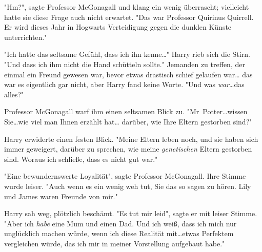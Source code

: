 "Hm?", sagte Professor McGonagall und klang ein wenig überrascht; vielleicht hatte sie diese Frage auch nicht erwartet. "Das war Professor Quirinus Quirrell. Er wird dieses Jahr in Hogwarts Verteidigung gegen die dunklen Künste unterrichten."

"Ich hatte das seltsame Gefühl, dass ich ihn kenne…" Harry rieb sich die Stirn. "Und dass ich ihm nicht die Hand schütteln sollte." Jemanden zu treffen, der einmal ein Freund gewesen war, bevor etwas drastisch schief gelaufen war… das war es eigentlich gar nicht, aber Harry fand keine Worte. "Und was \emph{war}…das alles?" 

Professor McGonagall warf ihm einen seltsamen Blick zu. "Mr~Potter…wissen Sie…wie viel man Ihnen erzählt hat… darüber, wie Ihre Eltern gestorben sind?" 

Harry erwiderte einen festen Blick. "Meine Eltern leben noch, und sie haben sich immer geweigert, darüber zu sprechen, wie meine \emph{genetischen} Eltern gestorben sind. Woraus ich schließe, dass es nicht gut war." 

"Eine bewundernswerte Loyalität", sagte Professor McGonagall. Ihre Stimme wurde leiser. "Auch wenn es ein wenig weh tut, Sie das so sagen zu hören. Lily und James waren Freunde von mir." 

Harry sah weg, plötzlich beschämt. "Es tut mir leid", sagte er mit leiser Stimme. "Aber ich \emph{habe} eine Mum und einen Dad. Und ich weiß, dass ich mich nur unglücklich machen würde, wenn ich diese Realität mit…etwas Perfektem vergleichen würde, das ich mir in meiner Vorstellung aufgebaut habe." 

